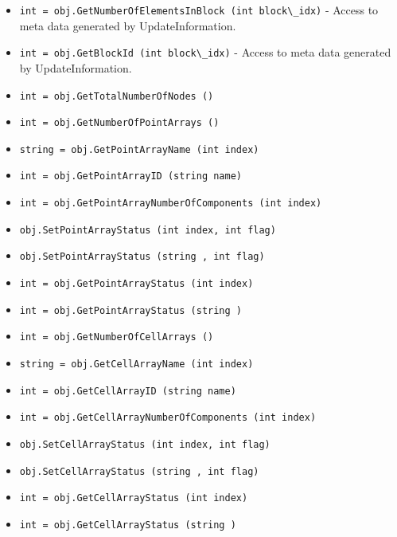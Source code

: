 \begin{itemize}
\item  \verb|int = obj.GetNumberOfElementsInBlock (int block\_idx)| -  Access to meta data generated by UpdateInformation.

\item  \verb|int = obj.GetBlockId (int block\_idx)| -  Access to meta data generated by UpdateInformation.

\item  \verb|int = obj.GetTotalNumberOfNodes ()|

\item  \verb|int = obj.GetNumberOfPointArrays ()|

\item  \verb|string = obj.GetPointArrayName (int index)|

\item  \verb|int = obj.GetPointArrayID (string name)|

\item  \verb|int = obj.GetPointArrayNumberOfComponents (int index)|

\item  \verb|obj.SetPointArrayStatus (int index, int flag)|

\item  \verb|obj.SetPointArrayStatus (string , int flag)|

\item  \verb|int = obj.GetPointArrayStatus (int index)|

\item  \verb|int = obj.GetPointArrayStatus (string )|

\item  \verb|int = obj.GetNumberOfCellArrays ()|

\item  \verb|string = obj.GetCellArrayName (int index)|

\item  \verb|int = obj.GetCellArrayID (string name)|

\item  \verb|int = obj.GetCellArrayNumberOfComponents (int index)|

\item  \verb|obj.SetCellArrayStatus (int index, int flag)|

\item  \verb|obj.SetCellArrayStatus (string , int flag)|

\item  \verb|int = obj.GetCellArrayStatus (int index)|

\item  \verb|int = obj.GetCellArrayStatus (string )|


\end{itemize}

